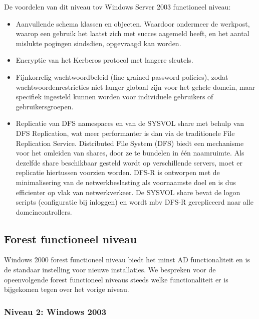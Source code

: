 De voordelen van dit niveau tov Windows Server 2003 functioneel niveau:
\begin{itemize}
	\item Aanvullende schema klassen en objecten. Waardoor ondermeer de
		werkpost, waarop een gebruik het laatst zich met succes aagemeld
		heeft, en het aantal mislukte pogingen sindsdien, opgevraagd
		kan worden.
	\item Encryptie van het Kerberos protocol met langere sleutels.
	\item Fijnkorrelig wachtwoordbeleid (fine-grained password policies),
		zodat wachtwoordenrestricties niet langer globaal zijn voor het
		gehele domein, maar specifiek ingesteld kunnen worden voor
		individuele gebruikers of gebruikersgroepen.
	\item Replicatie van DFS namespaces en van de SYSVOL share met behulp
		van DFS Replication, wat meer performanter is dan via de
		traditionele File Replication Service. Distributed File System
		(DFS) biedt een mechanisme voor het omleiden van shares, door ze
		te bundelen in één naamruimte. Als dezelfde share beschikbaar
		gesteld wordt op verschillende servers, moet er replicatie
		hiertussen voorzien worden. DFS-R is ontworpen met de
		minimalisering van de netwerkbeslasting als voornaamste doel en
		is dus efficienter op vlak van netwerkverkeer.
		De SYSVOL share bevat de logon scripts (configuratie bij
		inloggen) en wordt mbv DFS-R gerepliceerd naar alle
		domeincontrollers.
\end{itemize}

\subsection{Forest functioneel niveau}

Windows 2000 forest functioneel niveau biedt het minst AD functionaliteit en is
de standaar instelling voor nieuwe installaties. We bespreken voor de
opeenvolgende forest functioneel niveaus steeds welke functionaliteit er is
bijgekomen tegen over het vorige niveau.

\subsubsection{Niveau 2: Windows 2003}

